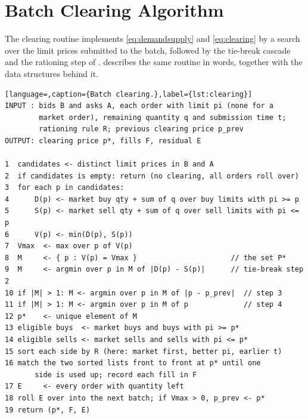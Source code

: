 \chapter{Batch Clearing Algorithm}
\label{app:algorithm}

The clearing routine implements \eqref{eq:demandsupply} and
\eqref{eq:clearing} by a search over the limit prices submitted to the
batch, followed by the tie-break cascade and the rationing step of
.  describes the same routine in
words, together with the data structures behind it.

\begin{lstlisting}[language=,caption={Batch clearing.},label={lst:clearing}]
INPUT : bids B and asks A, each order with limit pi (none for a
        market order), remaining quantity q and submission time t;
        rationing rule R; previous clearing price p_prev
OUTPUT: clearing price p*, fills F, residual E

1  candidates <- distinct limit prices in B and A
2  if candidates is empty: return (no clearing, all orders roll over)
3  for each p in candidates:
4      D(p) <- market buy qty + sum of q over buy limits with pi >= p
5      S(p) <- market sell qty + sum of q over sell limits with pi <= p
6      V(p) <- min(D(p), S(p))
7  Vmax  <- max over p of V(p)
8  M     <- { p : V(p) = Vmax }                      // the set P*
9  M     <- argmin over p in M of |D(p) - S(p)|      // tie-break step 2
10 if |M| > 1: M <- argmin over p in M of |p - p_prev|  // step 3
11 if |M| > 1: M <- argmin over p in M of p             // step 4
12 p*    <- unique element of M
13 eligible buys  <- market buys and buys with pi >= p*
14 eligible sells <- market sells and sells with pi <= p*
15 sort each side by R (here: market first, better pi, earlier t)
16 match the two sorted lists front to front at p* until one
       side is used up; record each fill in F
17 E     <- every order with quantity left
18 roll E over into the next batch; if Vmax > 0, p_prev <- p*
19 return (p*, F, E)
\end{lstlisting}

